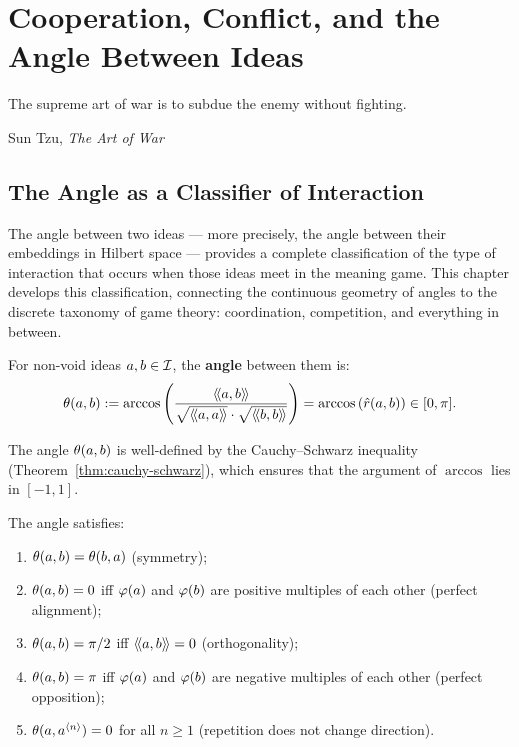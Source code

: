 \chapter{Cooperation, Conflict, and the Angle Between Ideas}
\label{ch:cooperation}

\epigraph{The supreme art of war is to subdue the enemy without
fighting.}{Sun Tzu, \textit{The Art of War}}

\section{The Angle as a Classifier of Interaction}

The angle between two ideas --- more precisely, the angle between their
embeddings in Hilbert space --- provides a complete classification of the type
of interaction that occurs when those ideas meet in the meaning game. This
chapter develops this classification, connecting the continuous geometry of angles
to the discrete taxonomy of game theory: coordination, competition, and
everything in between.

\begin{definition}
\label{def:angle}
For non-void ideas $a, b \in \mathcal{I}$, the \textbf{angle} between them is:
\[
  \theta(a,b) := \arccos\left(\frac{\langle\!\langle a, b \rangle\!\rangle}
  {\sqrt{\langle\!\langle a, a \rangle\!\rangle} \cdot \sqrt{\langle\!\langle b, b \rangle\!\rangle}}\right)
  = \arccos\left(\hat{r}(a, b)\right) \in [0, \pi].
\]
\end{definition}

The angle $\theta(a,b)$ is well-defined by the Cauchy--Schwarz inequality
(Theorem~\ref{thm:cauchy-schwarz}), which ensures that the argument of
$\arccos$ lies in $[-1, 1]$.

\begin{theorem}
\label{thm:angle-properties}
The angle satisfies:
\begin{enumerate}
\item $\theta(a,b) = \theta(b,a)$ (symmetry);
\item $\theta(a,b) = 0$ iff $\varphi(a)$ and $\varphi(b)$ are positive
multiples of each other (perfect alignment);
\item $\theta(a,b) = \pi/2$ iff $\langle\!\langle a, b \rangle\!\rangle = 0$ (orthogonality);
\item $\theta(a,b) = \pi$ iff $\varphi(a)$ and $\varphi(b)$ are negative
multiples of each other (perfect opposition);
\item $\theta(a,a^{\langle n \rangle}) = 0$ for all $n \geq 1$
(repetition does not change direction).
\end{enumerate}
\end{theorem}

